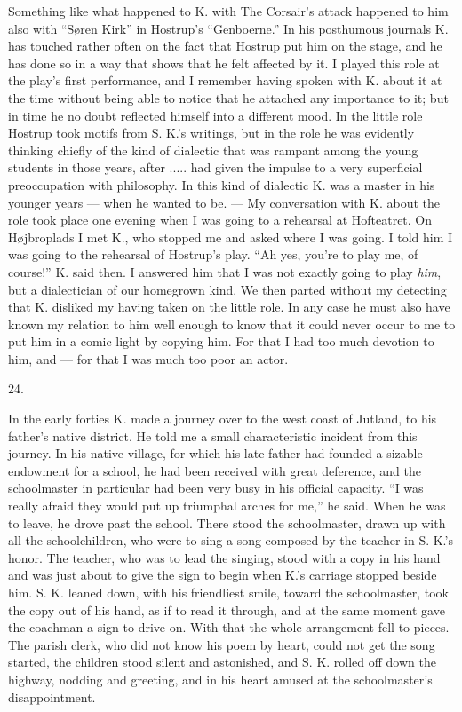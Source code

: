 \documentclass[12pt,a4paper,openany]{book}
\newcommand{\secnum}[1]{\par\begin{center}#1\end{center}\par\nobreak}
\newcommand{\opage}[1]{\marginnote{\footnotesize\textit{[#1]}}}
\begin{document}
Something like what happened to K. with The Corsair's attack happened to
him also with ``Søren Kirk'' in Hostrup's ``Genboerne.'' In his
posthumous journals K. has touched rather often on the fact that Hostrup
put him on the stage, and he has done so in a way that shows that he felt
affected by it. I played this role at the play's first performance, and I
remember having spoken with K. about it at the time without being able to
notice that he attached any importance to it; but in time he no doubt
reflected himself into a different mood. In the little role Hostrup took
motifs from S. K.'s writings, but in the role he was evidently thinking
chiefly of the kind of dialectic that was rampant among the young students
in those years, after ..... had given the impulse to a very superficial
preoccupation with philosophy. In this kind of dialectic K. was a master
in his younger years --- when he wanted to be. --- My conversation
\opage{354}with K. about the role took place one evening when I was going
to a rehearsal at Hofteatret. On Højbroplads I met K., who stopped me and
asked where I was going. I told him I was going to the rehearsal of
Hostrup's play. ``Ah yes, you're to play me, of course!'' K. said then. I
answered him that I was not exactly going to play \emph{him}, but a
dialectician of our homegrown kind. We then parted without my detecting
that K. disliked my having taken on the little role. In any case he must
also have known my relation to him well enough to know that it could never
occur to me to put him in a comic light by copying him. For that I had
too much devotion to him, and --- for that I was much too poor an actor.

\secnum{24.}

In the early forties K. made a journey over to the west coast of Jutland,
to his father's native district. He told me a small characteristic
incident from this journey.
In his native village, for which his late father had founded a sizable
endowment for a school, he had been received with great deference, and
the schoolmaster in particular had been very busy in his official
capacity. ``I was really afraid they would put up triumphal arches for
me,'' he said. When he was to leave, he drove past the school. There
stood the schoolmaster, drawn up with all the schoolchildren, who were to
sing a song composed by the teacher in S. K.'s honor. The teacher, who was
to lead the singing, stood with a copy in his hand and was just about to
give the sign to begin when K.'s carriage stopped beside him. S. K. leaned
down, with his friendliest smile, toward the schoolmaster, took the copy
out of his hand, as if to read it through, and at the same moment gave
the coachman a sign to drive on. With that the whole arrangement fell to
pieces. The parish clerk, who did not know his poem by heart, could not
get the song started, the children stood silent
\opage{355}and astonished, and S. K. rolled off down the highway, nodding
and greeting, and in his heart amused at the schoolmaster's
disappointment.
\end{document}
